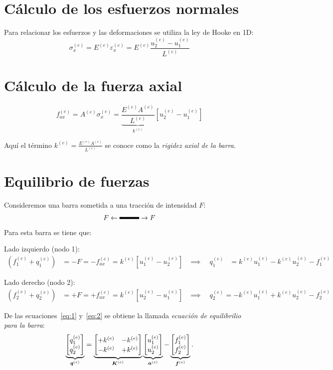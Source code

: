 \documentclass[12pt,letterpaper]{article}
\newcommand{\ve}[1]{{\boldsymbol{#1}}}
\newcommand{\ma}[1]{{\boldsymbol{#1}}}
\begin{document}
\section{Cálculo de los esfuerzos normales}
Para relacionar los esfuerzos y las deformaciones se utiliza la ley de Hooke en 1D:
\[
\sigma_x^{(e)} = E^{(e)} \varepsilon_x^{(e)} = E^{(e)} \frac{u_2^{(e)} - u_1^{(e)}}{L^{(e)}} 
\]

\section{Cálculo de la fuerza axial}

\[f_{ax}^{(e)}=A^{(e)} \sigma_x^{(e)} = \underbrace{\frac{E^{(e)} A^{(e)}}{L^{(e)}}}_{k^{(e)}} \left [ u_2^{(e)}-u_1^{(e)} \right ]\]

Aquí el término $k^{(e)} = \frac{E^{(e)} A^{(e)}}{L^{(e)}}$ se conoce como la \emph{rigidez axial de la barra}.

\section{Equilibrio de fuerzas}
Consideremos una barra sometida a una tracción de intensidad $F$:
\[
F \leftarrow\rule[0.5mm]{1cm}{0.1cm}\rightarrow F
\]
Para esta barra se tiene que:

Lado izquierdo (nodo 1):
\begin{align}
    \left( f_1^{(e)} + q_1^{(e)} \right) &= -F = -f_{ax}^{(e)} = k^{(e)} \left[u_1^{(e)} - u_2^{(e)} \right] 
    &\implies\quad
q_1^{(e)} &= k^{(e)} u_1^{(e)} - k^{(e)} u_2^{(e)} - f_1^{(e)} \label{eq:1}
\end{align}

Lado derecho (nodo 2):
\begin{align}
\left ( f_2^{(e)} + q_2^{(e)} \right ) &= +F = +f_{ax}^{(e)} = k^{(e)} \left[u_2^{(e)} - u_1^{(e)} \right] 
&\implies\quad
q_2^{(e)} = -k^{(e)} u_1^{(e)} + k^{(e)} u_2^{(e)} - f_2^{(e)} \label{eq:2}
\end{align}

De las ecuaciones~\eqref{eq:1} y~\eqref{eq:2} se obtiene la llamada \emph{ecuación de equilibrilio para la barra}:
\begin{equation}
\underbrace{%
\begin{bmatrix}
	q_1^{(e)} \\
	q_2^{(e)}
\end{bmatrix}}_{\ve{q}^{(e)}}
=
\underbrace{\begin{bmatrix}
	+k^{(e)} & -k^{(e)}\vphantom{q_1^{(e)}}\\
	-k^{(e)} & +k^{(e)}\vphantom{q_2^{(e)}}
\end{bmatrix}}_{\ma{K}^{(e)}}
\underbrace{\begin{bmatrix}
	u_1^{(e)}\\
	u_2^{(e)}
\end{bmatrix}}_{\ve{a}^{(e)}}
-
\underbrace{\begin{bmatrix}
	f_1^{(e)}\\
	f_2^{(e)}
\end{bmatrix}}_{\ve{f}^{(e)}}.
\end{equation}
\end{document}

